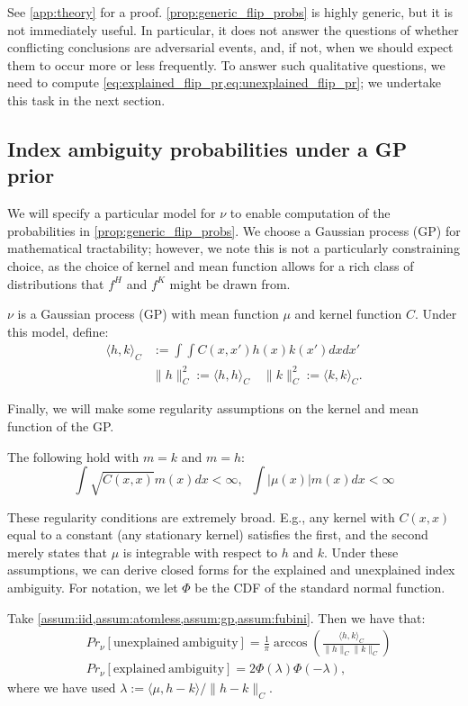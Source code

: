 See \cref{app:theory} for a proof.
\cref{prop:generic_flip_probs} is highly generic, but it is not immediately useful.
In particular, it does not answer the questions of whether conflicting conclusions are adversarial events, and, if not, when we should expect them to occur more or less frequently.
To answer such qualitative questions, we need to compute \cref{eq:explained_flip_pr,eq:unexplained_flip_pr}; we undertake this task in the next section.

\subsection{Index ambiguity probabilities under a GP prior}
\label{sec:gp_sign_flips}
We will specify a particular model for $\nu$ to enable computation of the probabilities in \cref{prop:generic_flip_probs}.
We choose a Gaussian process (GP) for mathematical tractability; however, we note this is not a particularly constraining choice, as the choice of kernel and mean function allows for a rich class of distributions that $f^H$ and $f^K$ might be drawn from.
\begin{assumption} \label{assum:gp}
	$\nu$ is a Gaussian process (GP) with mean function $\mu$ and kernel function $C$. Under this model, define:
	\begin{align*}
		 \langle h, k \rangle_C &:= \int\int C(x,x') h(x) k(x') dx dx' \\
		& \| h \|_C^2 := \langle h, h \rangle_C \quad \| k \|_C^2 := \langle k, k \rangle_C.
	\end{align*}
\end{assumption}
Finally, we will make some regularity assumptions on the kernel and mean function of the GP.
\begin{assumption} \label{assum:fubini}
	The following hold with $m = k$ and $m = h$:
	\begin{equation}
		\int \sqrt{C(x,x)} m(x) dx < \infty, \;\; \int | \mu(x) | m(x) dx < \infty
	\end{equation}
\end{assumption}
These regularity conditions are extremely broad.
E.g., any kernel with $C(x,x)$ equal to a constant (any stationary kernel) satisfies the first, and the second merely states that $\mu$ is integrable with respect to $h$ and $k$.
Under these assumptions, we can derive closed forms for the explained and unexplained index ambiguity.
For notation, we let $\Phi$ be the CDF of the standard normal function.
\begin{proposition} \label{prop:sign_flip_gp}
	Take \cref{assum:iid,assum:atomless,assum:gp,assum:fubini}. Then we have that:
	\begin{align}
		&Pr_\nu[\mathrm{unexplained\ ambiguity}] = \frac{1}{\pi} \arccos\left(\frac{\langle h, k \rangle_C}{\| h \|_C \| k \|_C} \right) \label{eq:unexplained_flip_pr_gp} \\
		&Pr_\nu[\mathrm{explained\ ambiguity}] = 2 \Phi (\lambda) \Phi(-\lambda), \label{eq:explained_flip_pr_gp}
	\end{align}
	where we have used $\lambda := \langle \mu, h-k \rangle / \|h -k\|_C$.
\end{proposition}	
